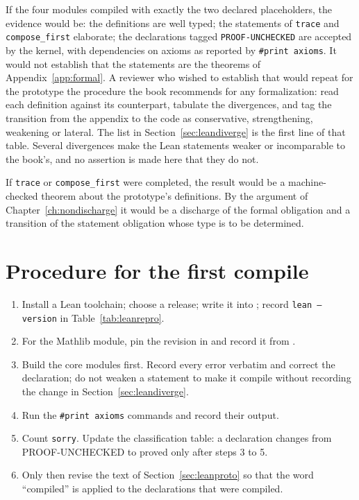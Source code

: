 If the four modules compiled with exactly the two declared placeholders, the evidence would be: the definitions are well typed; the statements of \texttt{trace} and \texttt{compose\_first} elaborate; the declarations tagged \texttt{PROOF-UNCHECKED} are accepted by the kernel, with dependencies on axioms as reported by \texttt{\#print axioms}. It would not establish that the statements are the theorems of Appendix~\ref{app:formal}. A reviewer who wished to establish that would repeat for the prototype the procedure the book recommends for any formalization: read each definition against its counterpart, tabulate the divergences, and tag the transition from the appendix to the code as conservative, strengthening, weakening or lateral. The list in Section~\ref{sec:leandiverge} is the first line of that table. Several divergences make the Lean statements weaker or incomparable to the book's, and no assertion is made here that they do not.

If \texttt{trace} or \texttt{compose\_first} were completed, the result would be a machine-checked theorem about the prototype's definitions. By the argument of Chapter~\ref{ch:nondischarge} it would be a discharge of the formal obligation and a transition of the statement obligation whose type is to be determined.

\section{Procedure for the first compile}

\begin{enumerate}[label=(\arabic*)]
\item Install a Lean toolchain; choose a release; write it into ; record \texttt{lean --version} in Table~\ref{tab:leanrepro}.
\item For the Mathlib module, pin the revision in  and record it from .
\item Build the core modules first. Record every error verbatim and correct the declaration; do not weaken a statement to make it compile without recording the change in Section~\ref{sec:leandiverge}.
\item Run the \texttt{\#print axioms} commands and record their output.
\item Count \texttt{sorry}. Update the classification table: a declaration changes from PROOF-UNCHECKED to proved only after steps 3 to 5.
\item Only then revise the text of Section~\ref{sec:leanproto} so that the word ``compiled'' is applied to the declarations that were compiled.
\end{enumerate}

